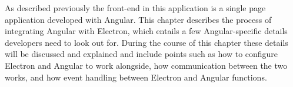 
As described previously the front-end in this application is a single page application developed with Angular.
This chapter describes the process of integrating Angular with Electron, which entails a few Angular-specific 
details developers need to look out for.
During the course of this chapter these details will be discussed and explained and include points such 
as how to configure Electron and Angular to work alongside, how communication between the two works, and 
how event handling between Electron and Angular functions.